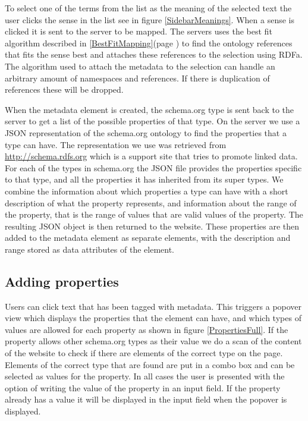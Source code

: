 To select one of the terms from the list as the meaning of the selected text the user clicks the sense in the list see in
figure \ref{SidebarMeanings}.
When a sense is clicked it is sent to the server to be mapped.
The servers uses the best fit algorithm described in \ref{BestFitMapping}(page \pageref{BestFitMapping}) to find the ontology references
that fits the sense best and attaches these references to the selection using RDFa.
The algorithm used to attach the metadata to the selection can handle an arbitrary amount of namespaces and references.
If there is duplication of references these will be dropped.

When the metadata element is created,
the schema.org type is sent back to the server to get a list of the possible properties of that type.
On the server we use a JSON representation of the schema.org ontology to find the properties that a type can have.
The representation we use was retrieved from \url{http://schema.rdfs.org} which is a support site that tries to
promote linked data.
For each of the types in schema.org the JSON file provides the properties specific to that type,
and all the properties it has inherited from its super types.
We combine the information about which properties a type can have with a short description of what the property represents,
and information about the range of the property, that is the range of values that are valid values of the property.
The resulting JSON object is then returned to the website.
These properties are then added to the metadata element as separate elements,
with the description and range stored as data attributes of the element.

\subsection{Adding properties}

Users can click text that has been tagged with metadata.
This triggers a popover view which displays the properties that the element can have,
and which types of values are allowed for each property as shown in figure \ref{PropertiesFull}.
If the property allows other schema.org types as their value we do a scan of the content of the website to check if
there are elements of the correct type on the page.
Elements of the correct type that are found are put in a combo box and can be selected as values for the property.
In all cases the user is presented with the option of writing the value of the property in an input field.
If the property already has a value it will be displayed in the input field when the popover is displayed.

